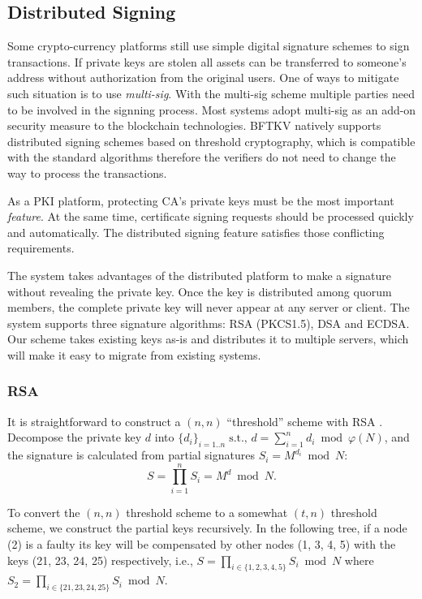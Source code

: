 \subsection{Distributed Signing}
Some crypto-currency platforms still use simple digital signature
schemes to sign transactions. If private keys are stolen all assets
can be transferred to someone's address without authorization from
the original users. One of ways to mitigate such situation is to
use {\em multi-sig}. With the multi-sig scheme multiple parties need
to be involved in the signning process. Most systems adopt multi-sig
as an add-on security measure to the blockchain technologies. BFTKV
natively supports distributed signing schemes based on threshold
cryptography, which is compatible with the standard algorithms
therefore the verifiers do not need to change the way to process the
transactions.

As a PKI platform, protecting CA's private keys must be the most
important {\em feature}. At the same time, certificate signing
requests should be processed quickly and automatically. The
distributed signing feature satisfies those conflicting requirements.

The system takes advantages of the distributed platform to make a
signature without revealing the private key. Once the key is
distributed among quorum members, the complete private key will never
appear at any server or client. The system supports three
signature algorithms: RSA (PKCS1.5), DSA and ECDSA. Our scheme takes
existing keys as-is and distributes it to multiple servers, which will
make it easy to migrate from existing systems.

\subsubsection*{RSA}
It is straightforward to construct a $(n, n)$ ``threshold'' scheme with
RSA \cite{garay,rabin}. Decompose the private key $d$ into $\{d_i\}_{i =
1..n} \; \text{s.t., } d = \sum_{i=1}^{n} d_i \bmod \varphi(N)$, and the
signature is calculated from partial signatures $S_i = M^{d_i} \bmod
N$:
\[
  S = \prod_{i=1}^{n} S_i = M^d \bmod N.
\]

To convert the $(n, n)$ threshold scheme to a somewhat $(t, n)$
threshold scheme, we construct the partial keys recursively. In the
following tree, if a node (2) is a faulty its key will be compensated
by other nodes (1, 3, 4, 5) with the keys (21, 23, 24, 25)
respectively, i.e., $S = \prod_{i \in \{1,2,3,4,5\}} S_i \bmod N$
where $S_2 = \prod_{i \in \{21,23,24,25\}} S_i \bmod N$.

